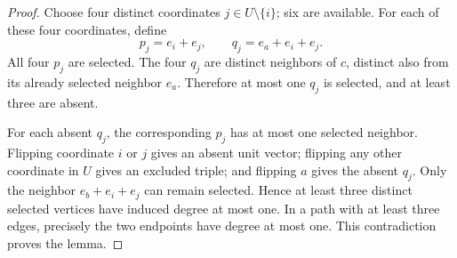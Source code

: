 \documentclass[11pt,a4paper]{article}
\theoremstyle{definition}
\theoremstyle{remark}
\begin{document}
\begin{proof}
Choose four distinct coordinates $j\in U\setminus\{i\}$; six are available. For each of these four coordinates, define
\[
p_j=e_i+e_j,\qquad q_j=e_a+e_i+e_j.
\]
All four $p_j$ are selected. The four $q_j$ are distinct neighbors of $c$, distinct also from its already selected neighbor $e_a$. Therefore at most one $q_j$ is selected, and at least three are absent.

For each absent $q_j$, the corresponding $p_j$ has at most one selected neighbor. Flipping coordinate $i$ or $j$ gives an absent unit vector; flipping any other coordinate in $U$ gives an excluded triple; and flipping $a$ gives the absent $q_j$. Only the neighbor $e_b+e_i+e_j$ can remain selected. Hence at least three distinct selected vertices have induced degree at most one. In a path with at least three edges, precisely the two endpoints have degree at most one. This contradiction proves the lemma.
\end{proof}
\end{document}

